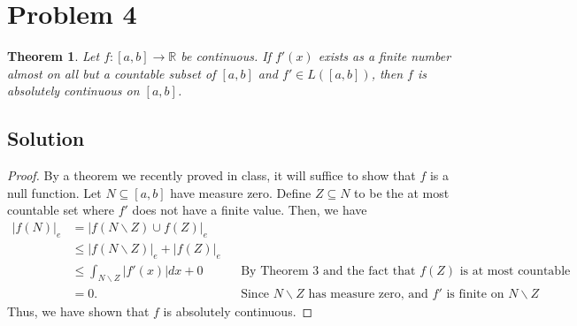\documentclass[10pt,a4paper]{article}
\theoremstyle{theorem}
\newtheorem{theorem}{Theorem}
\theoremstyle{definition}
\begin{document}
\section*{Problem 4}
\begin{theorem}
Let $f:[a, b] \to \mathbb{R}$ be continuous. If $f'(x)$ exists as a finite number almost on all but a countable subset of $[a, b]$ and $f' \in L([a, b])$, then $f$ is absolutely continuous on $[a, b]$.
\end{theorem}

\subsection*{Solution}
\begin{proof}
By a theorem we recently proved in class, it will suffice to show that $f$ is a null function. Let $N \subseteq [a, b]$ have measure zero. Define $Z \subseteq N$ to be the at most countable set where $f'$ does not have a finite value. Then, we have
\begin{align*}
|f(N)|_e &= |f(N\backslash Z) \cup f(Z)|_e\\
&\leq |f(N\backslash Z)|_e + |f(Z)|_e\\
&\leq \int_{N\backslash Z} |f'(x)|dx + 0 && \text{By Theorem 3 and the fact that } f(Z) \text{ is at most countable}\\
&= 0. &&\text{Since } N\backslash Z \text{ has measure zero, and } f' \text{ is finite on } N\backslash Z
\end{align*}
Thus, we have shown that $f$ is absolutely continuous.
\end{proof}
\end{document}
